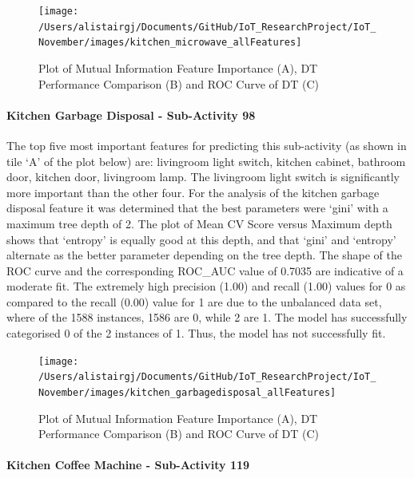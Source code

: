 \documentclass[11pt,]{article}
\let\oldparagraph\paragraph
\renewcommand{\paragraph}[1]{\oldparagraph{#1}\mbox{}}
\begin{document}
\begin{figure}[H]

{\centering \texttt{[image: /Users/alistairgj/Documents/GitHub/IoT\_ResearchProject/IoT\_November/images/kitchen\_microwave\_allFeatures]} 

}

\caption{Plot of Mutual Information Feature Importance (A), DT Performance Comparison (B) and ROC Curve of DT (C)}\label{fig:unnamed-chunk-21}
\end{figure}

\hypertarget{kitchen-garbage-disposal---sub-activity-98-1}{%
\paragraph{Kitchen Garbage Disposal - Sub-Activity
98}\label{kitchen-garbage-disposal---sub-activity-98-1}}

The top five most important features for predicting this sub-activity
(as shown in tile `A' of the plot below) are: livingroom light switch,
kitchen cabinet, bathroom door, kitchen door, livingroom lamp. The
livingroom light switch is significantly more important than the other
four. For the analysis of the kitchen garbage disposal feature it was
determined that the best parameters were `gini' with a maximum tree
depth of 2. The plot of Mean CV Score versus Maximum depth shows that
`entropy' is equally good at this depth, and that `gini' and `entropy'
alternate as the better parameter depending on the tree depth. The shape
of the ROC curve and the corresponding ROC\_AUC value of 0.7035 are
indicative of a moderate fit. The extremely high precision (1.00) and
recall (1.00) values for 0 as compared to the recall (0.00) value for 1
are due to the unbalanced data set, where of the 1588 instances, 1586
are 0, while 2 are 1. The model has successfully categorised 0 of the 2
instances of 1. Thus, the model has not successfully fit.

\begin{figure}[H]

{\centering \texttt{[image: /Users/alistairgj/Documents/GitHub/IoT\_ResearchProject/IoT\_November/images/kitchen\_garbagedisposal\_allFeatures]} 

}

\caption{Plot of Mutual Information Feature Importance (A), DT Performance Comparison (B) and ROC Curve of DT (C)}\label{fig:unnamed-chunk-22}
\end{figure}

\hypertarget{kitchen-coffee-machine---sub-activity-119-1}{%
\paragraph{Kitchen Coffee Machine - Sub-Activity
119}\label{kitchen-coffee-machine---sub-activity-119-1}}
\end{document}
